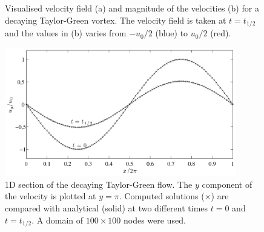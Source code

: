 \begin{figure}
  \centering
  \hspace{5pt} 
  \caption[Visualised velocity field for a decaying Taylor-Green
    vortex.]{Visualised velocity field (a) and magnitude of the
    velocities (b) for a decaying Taylor-Green vortex. The velocity
    field is taken at $t=t_{1/2}$ and the values in (b) varies from
    $-u_0/2$ (blue) to $u_0/2$ (red).}
  \label{fig:mb:taylor_vis}
\end{figure}

\begin{figure}
\begin{center}
\includegraphics[width=0.9\textwidth]{fig/taylor_uy.pdf}
\end{center}
\caption[1D section of the decaying Taylor-Green flow.]{1D section of
  the decaying Taylor-Green flow. The $y$ component of the velocity is
  plotted at $y = \pi$. Computed solutions ($\times$) are compared
  with analytical (solid) at two different times $t = 0$ and $t =
  t_{1/2}$. A domain of $100\times100$ nodes were used.}
\label{fig:mb:tg_uy}
\end{figure}

